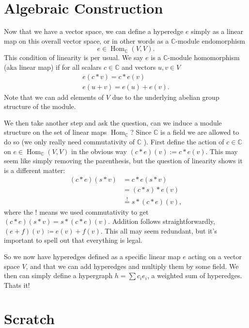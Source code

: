 \documentclass{article}
\newcommand{\field}{\mathbb{C}}
\DeclareMathOperator{\Hom}{Hom}
\begin{document}
\begin{figure} \label{fig:projection_circuits}
    
\end{figure}

\section{Algebraic Construction}
Now that we have a vector space, we can define a hyperedge $e$ simply as a linear map on this overall vector space, or in other words as a $\field$-module endomorphism
\begin{equation}
    e \in \Hom_{\field} (V, V).
\end{equation}
This condition of linearity is per usual. We say $e$ is a $\field$-module homomorphism (aka linear map) if for all scalars $c \in \field$ and vectors $u, v \in V$
\begin{align}
    e(c * v) = c * e(v) \\
    e (u + v) = e(u) + e(v).
\end{align}
Note that we can add elements of $V$ due to the underlying abelian group structure of the module. 

We then take another step and ask the question, can we induce a module structure on the set of linear maps $\Hom_{\field}$? Since $\field$ is a field we are allowed to do so (we only really need commutativity of $\field$ ). First define the action of $c \in \field$ on $e \in \Hom_\field(V, V)$ in the obvious way $(c * e) (v) := c * e(v)$. This may seem like simply removing the parenthesis, but the question of linearity shows it is a different matter:
\begin{align}
    (c * e) (s * v) &= c * e( s * v) \\
    &= (c * s) * e(v) \\
    &\overset{!}{=} s * (c * e) (v),
\end{align}
where the ! means we used commutativity to get $(c *e) (s * v) = s * (c * e) (v)$. Addition follows straightforwardly, $(e+f) (v) \coloneqq e(v) + f(v)$. This all may seem redundant, but it's important to spell out that everything is legal.

So we now have hyperedges defined as a specific linear map $e$ acting on a vector space $V$, and that we can add hyperedges and multiply them by some field. We then can simply define a hypergraph $h = \sum c_i e_i$, a weighted sum of hyperedges. Thats it! 


\section{Scratch}
\end{document}
